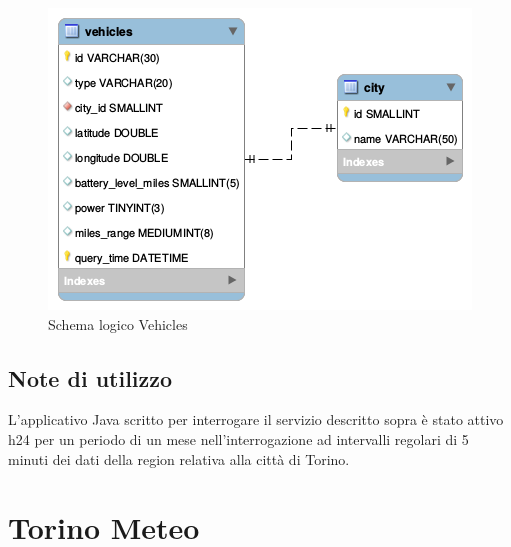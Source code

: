 \begin{figure}[H]                                                                                                                                                            
\centering                                                                                                                                                                   
\includegraphics[width=\textwidth]{diagrams/vehicles_logic}                                                                                                                                   
\caption{Schema logico Vehicles}                                                                                                                                            
\label{fig:vehicles_logic_physic}                                                                                                                                                           
\end{figure}

\subsection{Note di utilizzo}

L'applicativo Java scritto per interrogare il servizio descritto sopra è stato attivo h24
per un periodo di un mese nell'interrogazione ad intervalli regolari di 5 minuti dei dati
della region relativa alla città di Torino.

\section{Torino Meteo}

